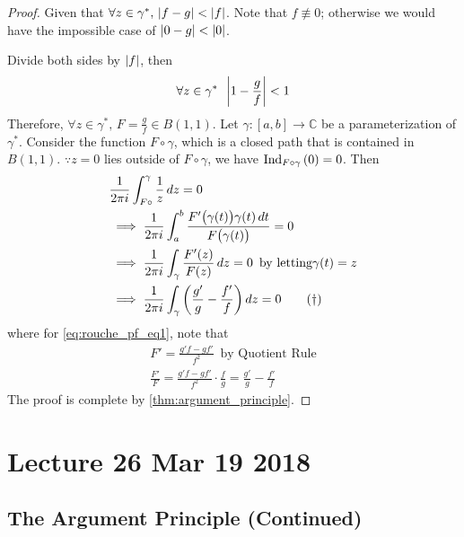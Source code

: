 \documentclass[11pt, oneside]{book}
\begin{document}
\begin{proof}
  Given that $\forall z \in \gamma^*, \, \abs{f - g} < \abs{f}$. Note that $f \not\equiv 0$; otherwise we would have the impossible case of $\abs{0 - g} < \abs{0}$.

  Divide both sides by $\abs{f}$, then
  \begin{equation*}
    \forall z \in \gamma^* \enspace \abs{1 - \frac{g}{f} } < 1
  \end{equation*}
  Therefore, $\forall z \in \gamma^*, \, F = \frac{g}{f} \in B(1, 1)$. Let $\gamma : [a, b] \to \mathbb{C}$ be a parameterization of $\gamma^*$. Consider the function $F \circ \gamma$, which is a closed path that is contained in $B(1, 1)$. $\because z = 0$ lies outside of $F \circ \gamma$, we have $\ind{0}{F \circ \gamma} = 0$. Then
  \begin{align}
    &\frac{1}{2 \pi i} \int_{F \circ}^{\gamma} \frac{1}{z} \dif{z} = 0 \nonumber \\
    &\implies \frac{1}{2 \pi i} \int_{a}^{b} \frac{F'\big(\gamma(t)\big) \gamma(t) \dif{t}}{F\big(\gamma(t)\big)} = 0 \nonumber \\
    &\implies \frac{1}{2 \pi i} \int_{\gamma} \frac{F'(z)}{F(z)} \dif{z} = 0 \enspace \text{by letting} \gamma(t) = z \nonumber \\
    &\implies \frac{1}{2 \pi i} \int_{\gamma} \left(\frac{g'}{g} - \frac{f'}{f} \right) \dif{z} = 0 \tag{$\dagger$}\label{eq:rouche_pf_eq1}
  \end{align}
  where for \cref{eq:rouche_pf_eq1}, note that
  \begin{gather*}
    F' = \frac{g'f - gf'}{f^2} \enspace \text{by Quotient Rule} \\
    \frac{F'}{F} = \frac{g'f - gf'}{f^2} \cdot \frac{f}{g} = \frac{g'}{g} - \frac{f'}{f} 
  \end{gather*}
  The proof is complete by \cref{thm:argument_principle}.
\end{proof}



\chapter{Lecture 26 Mar 19 2018}
  \label{chapter:lecture_26_mar_19_2018}

\section{The Argument Principle (Continued)} %
\label{sec:the_argument_principle_continued}
\end{document}

